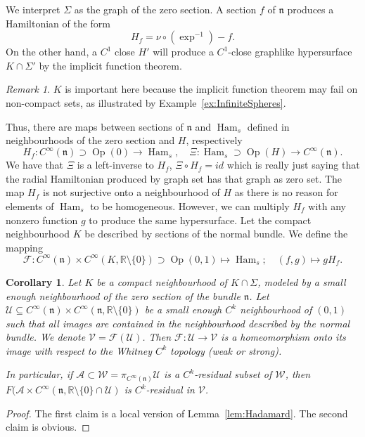 \documentclass{amsart}
\newcommand{\Acal}{{\mathcal{A}}}
\newcommand{\Fcal}{{\mathcal{F}}}
\newcommand{\Ucal}{{\mathcal{U}}}
\newcommand{\Vcal}{{\mathcal{V}}}
\newcommand{\Wcal}{{\mathcal{W}}}
\newcommand{\RR}{\mathbb{R}}
\newcommand{\Ham}{\operatorname{Ham}}
\newcommand{\Op}{\operatorname{Op}}
\newtheorem{corollary}[theorem]{Corollary}
\theoremstyle{definition}
\theoremstyle{remark}
\newtheorem{remark}[proposition]{Remark}
\numberwithin{equation}{section}
\begin{document}
We interpret $\Sigma$ as the graph of the zero section. A section $f$ of $\mathfrak n$ produces a Hamiltonian of the form $$H_f=\nu\circ(\exp^{-1})-f.$$ 
On the other hand, a $C^1$ close $H'$ will produce a $C^1$-close graphlike hypersurface $K\cap\Sigma'$ by the implicit function theorem.
\begin{remark}
    $K$ is important here because the implicit function theorem may fail on non-compact sets, as illustrated by Example~\ref{ex:InfiniteSpheres}.
\end{remark}
Thus, there are maps between sections of $\mathfrak n$ and $\Ham_s$ defined in neighbourhoods of the zero section and $H$, respectively
$$H_f:C^\infty(\mathfrak n)\supset \Op(0) \longrightarrow \Ham_s, \quad \Xi:\Ham_s\supset \Op(H)\longrightarrow C^\infty(\mathfrak n).$$
We have that $\Xi$ is a left-inverse to $H_f$, $\Xi\circ H_f=id$ which is really just saying that the radial Hamiltonian produced by graph set has that graph as zero set. The map $H_f$ is not surjective onto a neighbourhood of $H$ as there is no reason for elements of $\Ham_s$ to be homogeneous. However, we can multiply $H_f$ with any nonzero function $g$ to produce the same hypersurface. Let the compact neighbourhood $K$ be described by sections of the normal bundle. We define the mapping 
$$\Fcal: C^\infty(\mathfrak n)\times C^\infty(K,\RR\setminus\{0\}) \supset \Op(0,1) \mapsto \Ham_s; \quad (f,g)\mapsto gH_f.$$

\begin{corollary}\label{cor:HamiltoniansToSurface}
    Let $K$ be a compact neighbourhood of $K\cap\Sigma$, modeled by a small enough neighbourhood of the zero section of the bundle $\mathfrak n$. Let $\Ucal\subseteq C^\infty(\mathfrak n)\times C^\infty(\mathfrak n,\RR\setminus\{0\})$ be a small enough $C^k$ neighbourhood of $(0,1)$ such that all images are contained in the neighbourhood described by the normal bundle. We denote $\Vcal=\Fcal(\Ucal)$. Then $\Fcal:\Ucal\to\Vcal$ is a homeomorphism onto its image with respect to the Whitney $C^k$ topology (weak or strong). 
    
    In particular, if $\Acal\subset \Wcal =\pi_{C^\infty(\mathfrak n)}\Ucal$ is a $C^k$-residual subset of $\Wcal$, then $F(\Acal \times C^\infty(\mathfrak n,\RR\setminus\{0\}\cap \Ucal)$ is $C^k$-residual in $\Vcal$.
\end{corollary}
\begin{proof}
    The first claim is a local version of Lemma~\ref{lem:Hadamard}. The second claim is obvious.
\end{proof}
\end{document}
